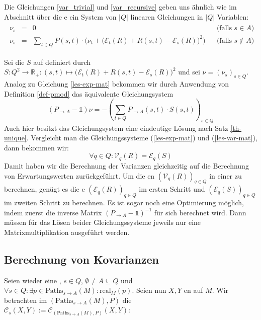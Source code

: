 \documentclass[a4paper]{article}
\theoremstyle{nonumberplain}
\begin{document}
Die Gleichungen \ref{var_trivial} und \ref{var_recursive} geben uns ähnlich wie im Abschnitt über die \expect{}e ein System von $|Q|$ linearen Gleichungen in $|Q|$ Variablen:
\begin{align}
\begin{aligned}
	\nu_s & = & 0 && \text{(falls $s \in A$)}\\
	\nu_s & = & \sum_{t \in Q}{ P(s,t) \cdot \Big(\nu_t + \big(\mathcal{E}_{t}(R) + R(s,t) - \mathcal{E}_{s}(R)\big)^2\Big) } && \text{(falls $s \notin A$)}
\end{aligned}\label{les-var}
\end{align}

Sei die \reward{} $S$ auf definiert durch $S: Q^2 \to \mathbb{R}_+ : (s,t) \mapsto \big(\mathcal{E}_{t}(R) + R(s,t) - \mathcal{E}_{s}(R)\big)^2$ und sei $\nu = (\nu_s)_{s\in Q}$. Analog zu Gleichung \ref{les-exp-mat} bekommen wir durch Anwendung von Definition \ref{def-pmod} das äquivalente Gleichungsystem
\begin{equation}
	(P_{\rightarrow A} - \mathbb{1}) \nu = - \left(\sum_{t \in Q}{ P_{\rightarrow A}(s,t) \cdot S(s,t) }\right)_{s \in Q}\label{les-var-mat}
\end{equation}
Auch hier besitzt das Gleichungsystem eine eindeutige Lösung nach Satz \ref{th-unique}. Vergleicht man die Gleichungssysteme (\ref{les-exp-mat}) und (\ref{les-var-mat}), dann bekommen wir:
\begin{equation}
\forall q \in Q : \mathcal{V}_q(R) = \mathcal{E}_q(S)
\end{equation}
Damit haben wir die Berechnung der Varianzen gleichzeitig auf die Berechnung von Erwartungswerten zurückgeführt. Um die \var{}en $(\mathcal{V}_q(R))_{q\in Q}$ in einer \mc{} zu berechnen, genügt es die \expect{}e $(\mathcal{E}_q(R))_{q\in Q}$ im ersten Schritt und $(\mathcal{E}_q(S))_{q\in Q}$ im zweiten Schritt zu berechnen. Es ist sogar noch eine Optimierung möglich, indem zuerst die inverse Matrix $(P_{\rightarrow A} - \mathbb{1})^{-1}$ für sich berechnet wird. Dann müssen für das Lösen beider Gleichungssysteme jeweils nur eine Matrixmultiplikation ausgeführt werden.

\subsection{Berechnung von Kovarianzen}
Seien wieder \mcex{} eine \mc{}, $s \in Q$, $\emptyset \neq A \subseteq Q$ und $\forall s \in Q: \exists p \in \mathrm{Paths}_{s \rightarrow A}(M) : \mathrm{real}_{M}(p)$. Seien nun $X, Y$ \reward{}en auf $M$. Wir betrachten im \probspace{} $(\mathrm{Paths}_{s \rightarrow A}(M), P)$ die \cov{} $\mathcal{C}_s(X,Y) := \mathcal{C}_{(\mathrm{Paths}_{s \rightarrow A}(M), P)}(X,Y)$:
\end{document}
